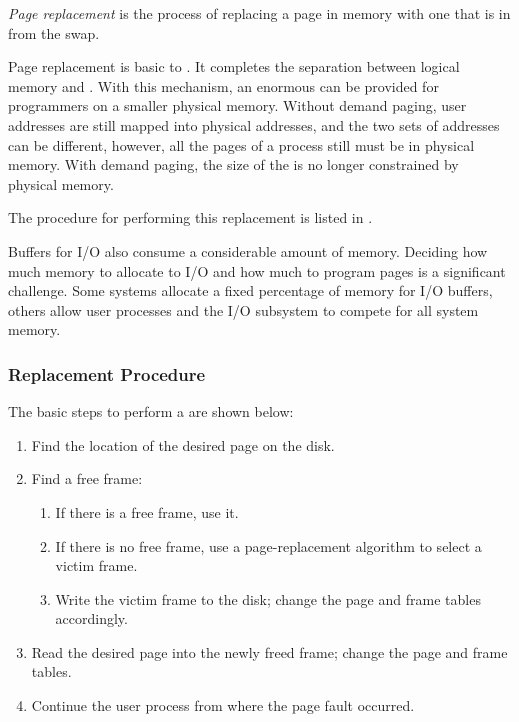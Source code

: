 \begin{definition}\label{def:Page_Replacement}
  \emph{Page replacement} is the process of replacing a page in memory with one that is  in from the swap.

  Page replacement is basic to .
  It completes the separation between logical memory and .
  With this mechanism, an enormous  can be provided for programmers on a smaller physical memory.
  Without demand paging, user addresses are still mapped into physical addresses, and the two sets of addresses can be different, however, all the pages of a process still must be in physical memory.
  With demand paging, the size of the  is no longer constrained by physical memory.

  The procedure for performing this replacement is listed in .
\end{definition}

Buffers for I/O also consume a considerable amount of memory.
Deciding how much memory to allocate to I/O and how much to program pages is a significant challenge.
Some systems allocate a fixed percentage of memory for I/O buffers, others allow user processes and the I/O subsystem to compete for all system memory.

\subsubsection{Replacement Procedure}\label{subsubsec:Page_Replacement_Procedure}
The basic steps to perform a  are shown below:
\begin{enumerate}[noitemsep]
\item Find the location of the desired page on the disk.
\item Find a free frame:
  \begin{enumerate}[noitemsep]
  \item If there is a free frame, use it.
  \item If there is no free frame, use a page-replacement algorithm to select a victim frame.
  \item Write the victim frame to the disk; change the page and frame tables accordingly.
  \end{enumerate}
\item Read the desired page into the newly freed frame; change the page and frame tables.
\item Continue the user process from where the page fault occurred.
\end{enumerate}

